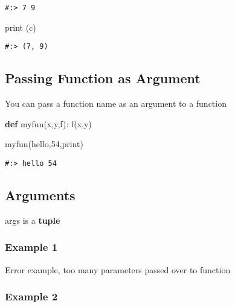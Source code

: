 \documentclass[
]{book}
\newenvironment{Shaded}{\begin{snugshade}}{\end{snugshade}}
\newcommand{\BuiltInTok}[1]{#1}
\newcommand{\DecValTok}[1]{\textcolor[rgb]{0.06,0.06,0.06}{#1}}
\newcommand{\KeywordTok}[1]{\textcolor[rgb]{0.27,0.27,0.27}{\textbf{#1}}}
\newcommand{\NormalTok}[1]{#1}
\newcommand{\StringTok}[1]{\textcolor[rgb]{0.5,0.5,0.5}{#1}}
\begin{document}
\begin{verbatim}
#:> 7 9
\end{verbatim}

\begin{Shaded}
\begin{Highlighting}[]
\BuiltInTok{print}\NormalTok{ (c)    }
\end{Highlighting}
\end{Shaded}

\begin{verbatim}
#:> (7, 9)
\end{verbatim}

\hypertarget{passing-function-as-argument}{%
\subsection{Passing Function as Argument}\label{passing-function-as-argument}}

You can pass a function name as an argument to a function

\begin{Shaded}
\begin{Highlighting}[]
\KeywordTok{def}\NormalTok{ myfun(x,y,f):}
\NormalTok{    f(x,y)}

\NormalTok{myfun(}\StringTok{\textquotesingle{}hello\textquotesingle{}}\NormalTok{,}\DecValTok{54}\NormalTok{,}\BuiltInTok{print}\NormalTok{)}
\end{Highlighting}
\end{Shaded}

\begin{verbatim}
#:> hello 54
\end{verbatim}

\hypertarget{arguments}{%
\subsection{Arguments}\label{arguments}}

args is a \textbf{tuple}

\hypertarget{example-1}{%
\subsubsection{Example 1}\label{example-1}}

Error example, too many parameters passed over to function

\hypertarget{example-2}{%
\subsubsection{Example 2}\label{example-2}}
\end{document}
